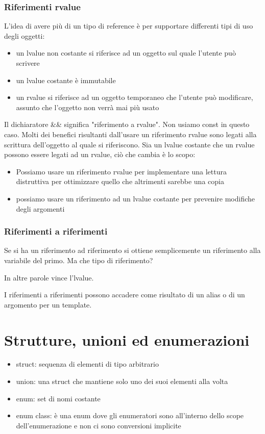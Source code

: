 \documentclass[11pt,a4paper]{book}
\begin{document}
\subsection{Riferimenti rvalue}
L'idea di avere più di un tipo di reference è per supportare differenti tipi di uso degli oggetti:
\begin{itemize}
	\item un lvalue non costante si riferisce ad un oggetto sul quale l'utente può scrivere
	\item un lvalue costante è immutabile
	\item un rvalue si riferisce ad un oggetto temporaneo che l'utente può modificare, assunto che l'oggetto non verrà mai più usato
\end{itemize}

Il dichiaratore \&\& significa "riferimento a rvalue". Non usiamo const in questo caso. Molti dei benefici risultanti dall'usare un riferimento rvalue sono legati alla scrittura dell'oggetto al quale si riferiscono. Sia un lvalue costante che un rvalue possono essere legati ad un rvalue, ciò che cambia è lo scopo:
\begin{itemize}
	\item Possiamo usare un riferimento rvalue per implementare una lettura distruttiva per ottimizzare quello che altrimenti sarebbe una copia
	\item possiamo usare un riferimento ad un lvalue costante per prevenire modifiche degli argomenti
\end{itemize}

\subsection{Riferimenti a riferimenti}
Se si ha un riferimento ad riferimento si ottiene semplicemente un riferimento alla variabile del primo. Ma che tipo di riferimento?
\label{code: 102}

In altre parole vince l'lvalue. 

I riferimenti a riferimenti possono accadere come risultato di un alias o di un argomento per un template.

\chapter{Strutture, unioni ed enumerazioni}
\begin{itemize}
	\item struct: sequenza di elementi di tipo arbitrario
	\item union: una struct che mantiene solo uno dei suoi elementi alla volta
	\item enum: set di nomi costante
	\item enum class: è una enum dove gli enumeratori sono all'interno dello scope dell'enumerazione e non ci sono conversioni implicite
\end{itemize}
\end{document}
